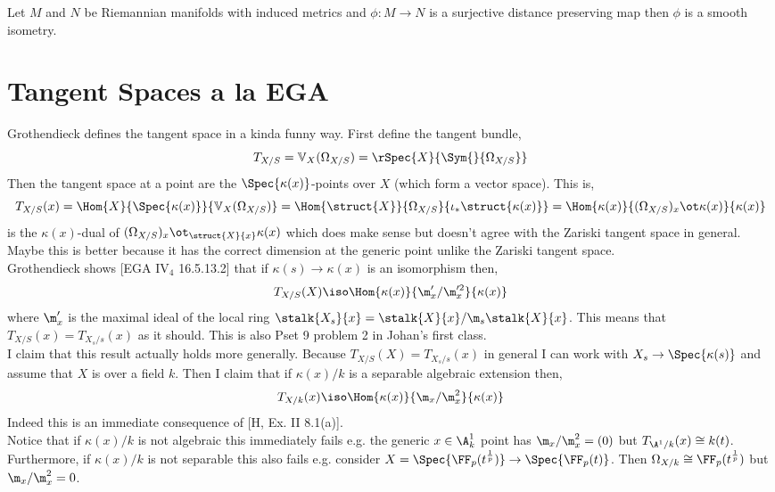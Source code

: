 \documentclass[12pt]{article}
\begin{document}
\begin{thm}
Let $M$ and $N$ be Riemannian manifolds with induced metrics and $\phi : M \to N$ is a surjective distance preserving map then $\phi$ is a smooth isometry.
\end{thm}

\section{Tangent Spaces a la EGA}

Grothendieck defines the tangent space in a kinda funny way. First define the tangent bundle,
\[ T_{X/S} = \mathbb{V}_X(\Omega_{X/S}) = \rSpec{X}{\Sym{}{\Omega_{X/S}}} \]
Then the tangent space at a point are the $\Spec{\kappa(x)}$-points over $X$ (which form a vector space). This is,
\[ T_{X/S}(x) = \Hom{X}{\Spec{\kappa(x)}}{\mathbb{V}_X(\Omega_{X/S})} = \Hom{\struct{X}}{\Omega_{X/S}}{\iota_* \struct{\kappa(x)}} = \Hom{\kappa(x)}{(\Omega_{X/S})_x \ot \kappa(x)}{\kappa(x)} \]
is the $\kappa(x)$-dual of $(\Omega_{X/S})_x \ot_{\struct{X}{x}} \kappa(x)$ which does make sense but doesn't agree with the Zariski tangent space in general. Maybe this is better because it has the correct dimension at the generic point unlike the Zariski tangent space.
\bigskip\\
Grothendieck shows [EGA IV$_4$ 16.5.13.2] that if $\kappa(s) \to \kappa(x)$ is an isomorphism then,
\[ T_{X/S}(X) \iso \Hom{\kappa(x)}{\m_x'/\m_x'^2}{\kappa(x)} \]
where $\m_x'$ is the maximal ideal of the local ring $\stalk{X_s}{x} = \stalk{X}{x} / \m_s \stalk{X}{x}$. This means that $T_{X/S}(x) = T_{X_s/s}(x)$ as it should. This is also Pset 9 problem 2 in Johan's first class.
\bigskip\\
I claim that this result actually holds more generally. Because $T_{X/S}(X) = T_{X_s/s}(x)$ in general I can work with $X_s \to \Spec{\kappa(s)}$ and assume that $X$ is over a field $k$. Then I claim that if $\kappa(x) / k$ is a separable algebraic extension then,
\[ T_{X/k}(x) \iso \Hom{\kappa(x)}{\m_x / \m_x^2}{\kappa(x)} \]
Indeed this is an immediate consequence of [H, Ex. II 8.1(a)].
\bigskip\\
Notice that if $\kappa(x) / k$ is not algebraic this immediately fails e.g. the generic $x \in \A^1_k$ point has $\m_x / \m_x^2 = (0)$ but $T_{\A^1/k}(x) \cong k(t)$. Furthermore, if $\kappa(x) / k$ is not separable this also fails e.g. consider $X = \Spec{\FF_p(t^{\frac{1}{p}})} \to \Spec{\FF_p(t)}$. Then $\Omega_{X/k} \cong \FF_p(t^{\frac{1}{p}})$ but $\m_x / \m_x^2 = 0$. 
\end{document}
